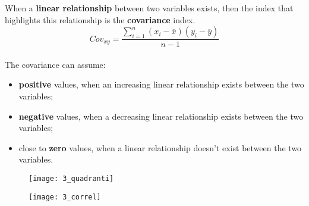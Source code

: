 \begin{frame}
  \vspace*{.25cm}
  When a \textbf{linear relationship} between two variables exists, then the index that highlights this relationship is the \textbf{covariance} index.\\
  \vspace*{.2cm}
  $$ Cov_{xy} = \frac{\sum_{i=1}^n{\left( x_i-\overline{x}\right)\left( y_i-\overline{y}\right)}}{n-1}  $$\\
  \vspace*{.4cm}
  The covariance can assume:
  \begin{itemize}
    \item \textbf{positive} values, when an increasing linear relationship exists between the two variables;
    \item \textbf{negative} values, when a decreasing linear relationship exists between the two variables;
    \item close to \textbf{zero} values, when a linear relationship doesn't exist between the two variables.
  \end{itemize}
\end{frame}

\begin{frame}
  \begin{figure}
    \centering
    \texttt{[image: 3\_quadranti]}
    \label{fig:quadranti}
  \end{figure}
\end{frame}

\begin{frame}
  \begin{figure}
    \centering
    \texttt{[image: 3\_correl]}
    \label{fig:correl}
  \end{figure}
\end{frame}

